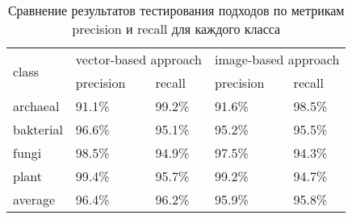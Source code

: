 \begin{table}[h]
\begin{tabular}{|l|l|l|l|l|}
\hline
\multirow{2}{*}{class} & \multicolumn{2}{l|}{vector-based approach} & \multicolumn{2}{l|}{image-based approach} \\ \cline{2-5} 
                       & precision             & recall             & precision             & recall            \\ \hline
archaeal               & 91.1\%                & 99.2\%             & 91.6\%                & 98.5\%            \\ \hline
bakterial              & 96.6\%                & 95.1\%             & 95.2\%                & 95.5\%            \\ \hline
fungi                  & 98.5\%                & 94.9\%             & 97.5\%                & 94.3\%            \\ \hline
plant                  & 99.4\%                & 95.7\%             & 99.2\%                & 94.7\%            \\ \hline
average                  & 96.4\%                & 96.2\%             & 95.9\%                & 95.8\%            \\ \hline
\end{tabular}
\caption{Сравнение результатов тестирования подходов по метрикам precision и recall для каждого класса}
\label{metrics_abfp}
\end{table}